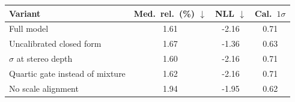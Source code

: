 \begin{tabular}{l ccc}
\toprule
Variant & Med.\ rel.\ (\%) $\downarrow$ & NLL $\downarrow$ & Cal.\ $1\sigma$ \\
\midrule
Full model & 1.61 & -2.16 & 0.71 \\
Uncalibrated closed form & 1.67 & -1.36 & 0.63 \\
$\sigma$ at stereo depth & 1.60 & -2.16 & 0.71 \\
Quartic gate instead of mixture & 1.62 & -2.16 & 0.71 \\
No scale alignment & 1.94 & -1.95 & 0.62 \\
\bottomrule
\end{tabular}